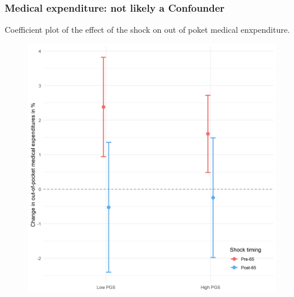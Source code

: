 \documentclass[10pt,compress,xcolor=dvipsnames,aspectratio=169]{beamer}    %
\newcounter{ex}
\newcommand{\1}[1]{\mathrm{1\hspace*{-2.5pt}l}[#1]}	%
\begin{document}
\begin{frame}
\frametitle{Medical expenditure: not likely a Confounder}
Coefficient plot of the effect of the shock on out of poket medical enxpenditure.
\begin{figure}[hbtp]

\centering
\includegraphics[height=0.8\textheight]{../../3_output/shock_effects/medexp_6070_100_cv.png}
\label{fig:medexp}
\end{figure}
\end{frame}

%
\end{document}
